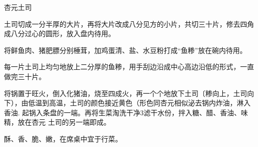 \begin{recipe}{杏元土司}

\ingredients


\preparation

\step 土司切成一分半厚的大片，再将大片改成八分见方的小片，共切三十片，修去四角
成八分过心的圆形，放入盘内待用。

\step 将鲜鱼肉、猪肥膘分别棰茸，加鸡蛋清、盐、水豆粉打成“鱼糁”放在碗内待用。

\step 每一片土司上均匀地放上二分厚的鱼糁，用手刮边沿成中心高边沿低的形式，一直
做完三十片。

\step 将锅置于旺火，倒入化猪油，烧至四成火，再一个个地放下土司〔糁向上，土司向
下），由低温到高温，土司的颜色接近黄色（形色同杏元相似泌去锅内炸油，淋入香油.
起锅入条盘的一端。再将生菜淘洗干净3滤干水份，拌入糖、醋、香油、味精，放在杏元
土司的另一端即成。

\features

酥、香、脆、嫩，在席桌中宜于行菜。

\end{recipe}

